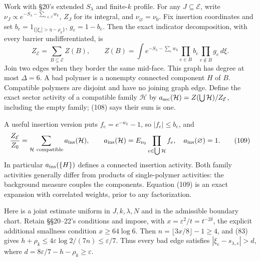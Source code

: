 \documentclass[11pt,a4paper]{article}
\begin{document}
Work with §20's extended \(S_\lambda\) and finite-\(k\) profile. For any
\(J\subseteq\mathcal E\), write
\(\nu_J\propto e^{-S_\lambda-\sum_{e\in J}w_k}\), \(Z_J\) for its
integral, and \(\nu_\varnothing=\nu_0\). Fix insertion coordinates and
set \(b_e=1_{\{|\xi_e|>\eta-\rho_k\}}\), \(g_e=1-b_e\). Then the exact
indicator decomposition, with every barrier undifferentiated, is
\[Z_{\mathcal E}=\sum_{B\subseteq\mathcal E}Z(B),\qquad
Z(B)=\int e^{-S_\lambda-\sum_e w_k}
 \prod_{e\in B}b_e\prod_{e\notin B}g_e\,d\xi.\tag{108}\] Join two edges
when they border the same mid-face. This graph has degree at most
\(\Delta=6\). A bad polymer is a nonempty connected component \(H\) of
\(B\). Compatible polymers are disjoint and have no joining graph edge.
Define the exact sector activity of a compatible family \(\mathcal H\)
by \(a_{\rm sec}(\mathcal H)=Z(\bigcup\mathcal H)/Z_{\mathcal E}\),
including the empty family; (108) says their sum is one.

A useful insertion version puts \(f_e=e^{-w_k}-1\), so \(|f_e|\le b_e\),
and \[\frac{Z_{\mathcal E}}{Z_0}
=\sum_{\mathcal H\ {\rm compatible}}a_{\rm ins}(\mathcal H),\qquad
 a_{\rm ins}(\mathcal H)=E_{\nu_0}\prod_{e\in\bigcup\mathcal H}f_e,
 \quad a_{\rm ins}(\varnothing)=1.\tag{109}\] In particular
\(a_{\rm ins}(\{H\})\) defines a connected insertion activity. Both
family activities generally differ from products of single-polymer
activities: the background measure couples the components. Equation
(109) is an exact expansion with correlated weights, prior to any
factorization.

Here is a joint estimate uniform in \(J,k,\lambda,N\) and in the
admissible boundary chart. Retain §§20--22's conditions and impose, with
\(x=\varepsilon^2/t=t^{-2\delta}\), the explicit additional smallness
condition \(x\ge64\log6\). Then \(n=\lfloor3x/8\rfloor-1\ge4\), and (83)
gives \(h+\rho_k\le4\varepsilon\log2/(7n)\le\varepsilon/7\). Thus every
bad edge satisfies \(|\xi_e-s_{\lambda,e}|>d\), where
\(d=8\varepsilon/7-h-\rho_k\ge\varepsilon\).
\end{document}
